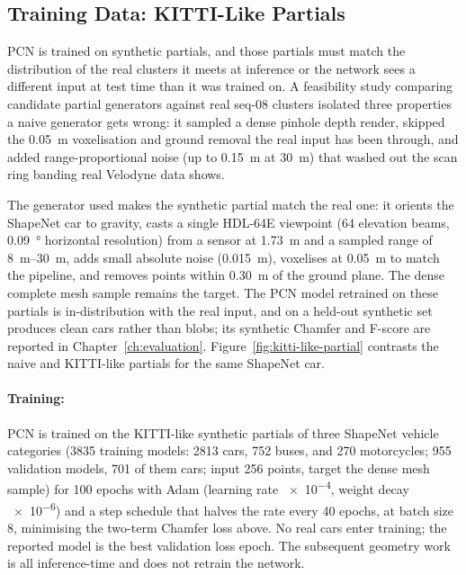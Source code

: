 \subsection{Training Data: KITTI-Like Partials}
\label{sec:completion-kittilike}

PCN is trained on synthetic partials, and those partials must match the distribution
of the real clusters it meets at inference or the network sees a different input at
test time than it was trained on. A feasibility study comparing candidate partial
generators against real seq-08 clusters isolated three properties a naive
generator gets wrong: it sampled a dense pinhole depth render, skipped the
\SI{0.05}{\meter} voxelisation and ground removal the real input has been through, and
added range-proportional noise (up to \SI{0.15}{\meter} at \SI{30}{\meter}) that
washed out the scan ring banding real Velodyne data shows.

The generator used makes the synthetic partial match the real one: it orients the
ShapeNet car to gravity, casts a single HDL-64E viewpoint (64 elevation beams,
\SI{0.09}{\degree} horizontal resolution) from a sensor at \SI{1.73}{\meter} and
a sampled range of \SIrange{8}{30}{\meter}, adds small absolute noise
(\SI{0.015}{\meter}), voxelises at \SI{0.05}{\meter} to match the pipeline, and
removes points within \SI{0.30}{\meter} of the ground plane. The dense complete
mesh sample remains the target. The PCN model retrained on these partials
is in-distribution with the real input, and on a held-out
synthetic set produces clean cars rather than blobs; its synthetic Chamfer and F-score are
reported in Chapter~\ref{ch:evaluation}. Figure~\ref{fig:kitti-like-partial} contrasts the
naive and KITTI-like partials for the same ShapeNet car.

\paragraph{Training:} PCN is trained on the KITTI-like synthetic partials of three ShapeNet
vehicle categories (\num{3835} training models: \num{2813} cars, \num{752} buses, and \num{270}
motorcycles; \num{955} validation models, \num{701} of them cars; input
\num{256} points, target the dense mesh sample) for \num{100} epochs with Adam
(learning rate \num{e-4}, weight decay \num{e-6}) and a step schedule that halves
the rate every \num{40} epochs, at batch size \num{8}, minimising the two-term
Chamfer loss above. No real cars enter training; the reported model
is the best validation loss epoch. The subsequent geometry
work is all inference-time and does not retrain the network.

